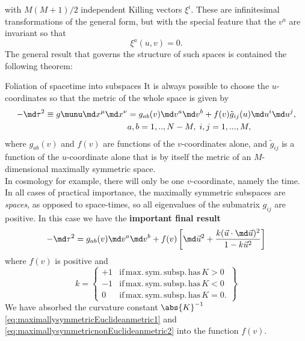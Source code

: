 with $M(M+1)/2$ independent Killing vectors $\xi^i$. These are infinitesimal transformations of the general form, but with the special feature that the $v^a$ are invariant so that
\begin{equation}
	\xi^a(u,v)=0.
\end{equation}
The general result that governs the structure of such spaces is contained the following theorem:
\begin{mybox}{Foliation of spacetime into subspaces}
	It is always possible to choose the $u$-coordinates so that the metric of the whole space is given by
	\begin{align}
	\label{eq:metricfoliatedSpacetimegeneral}
	-\md \tau^2 \equiv g\munu \md x^\mu \md x^\nu &= g_{ab} (v) \md v^a \md v^b + f(v) \tilde{g}_{ij}(u)\md u^i \md u^j,\\
	& a,b=1,..,N-M,\; i,j=1,...,M, \nonumber 
	\end{align}
	where $g_{ab}(v)$ and $f(v)$ are functions of the $v$-coordinates alone, and $\tilde{g}_{ij}$ is a function of the $u$-coordinate alone that is by itself the metric of an $M$-dimensional maximally symmetric space.
\\ In cosmology for example, there will only be one $v$-coordinate, namely the time.\\
In all cases of practical importance, the maximally symmetric subspaces are \emph{spaces}, as opposed to space-times, so all eigenvalues of the submatrix $g_{ij}$ are positive. In this case we have the \textbf{important final result}
\begin{equation}
\label{eq:metricfoliatedSubspacesMaximallySymmetricFINAL}
	-\md \tau^2 = g_{ab}(v) \md v^a \md v^b + f(v) \left[\md \vec{u}^2 + \frac{k(\vec{u}\cdot \md \vec{u})^2 }{1-k\vec{u}^2}\right]
\end{equation}
where $f(v)$ is positive and
\begin{equation}
	k = \left\{	\begin{array}{lr}
	+1 & \mathrm{if\,max.\,sym.\,subsp.\,has\,} K>0\\
	-1 & \mathrm{if\,max.\,sym.\,subsp.\,has\,} K<0\\
	0& \mathrm{if\,max.\, sym. \, subsp.\, has\,} K=0.
	\end{array}		\right\}
\end{equation}
We have absorbed the curvature constant $\abs{K}^{-1}$ \ref{eq:maximallysymmetricEuclideanmetric1} and \ref{eq:maximallysymmetricnonEuclideanmetric2} into the function $f(v)$.
\end{mybox}
